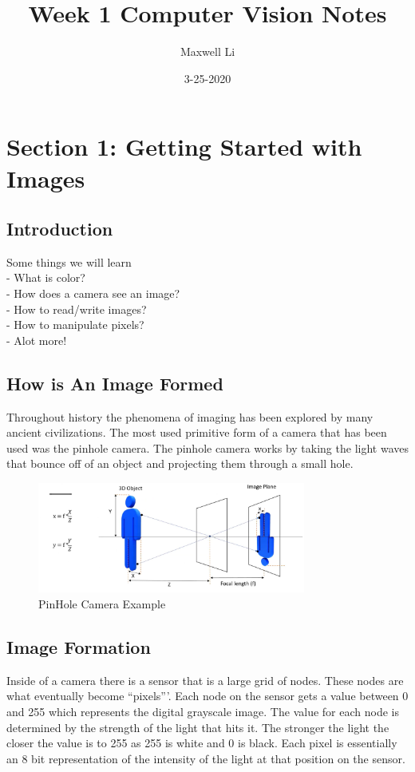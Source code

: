 \documentclass[fleqn]{article}
\title{Week 1 Computer Vision Notes}
\date{3-25-2020}
\author{Maxwell Li}
\begin{document}
  \color{black!20!white}
  \pagecolor{black!80!white}
  \maketitle
  \tableofcontents
  \setcounter{secnumdepth}{0}
  \newpage

  \section{\textbf{Section 1: Getting Started with Images}}
    \subsection{Introduction}
    Some things we will learn\\
    \quad - What is color?\\
    \quad - How does a camera see an image?\\
    \quad - How to read/write images?\\
    \quad - How to manipulate pixels?\\
    \quad - Alot more!

    \subsection{How is An Image Formed}
    Throughout history the phenomena of imaging has been explored by many ancient civilizations. The most used primitive form of a camera that has been used was the pinhole camera. The pinhole camera works by taking the light waves that bounce off of an object and projecting them through a small hole.

    \begin{figure}[h]
      \centering
      \includegraphics[width = 250pt]{pinholecamera.png}
      \caption{PinHole Camera Example}
      \label{fig: Pinhole Camera}
    \end{figure}


    \subsection{Image Formation}
    Inside of a camera there is a sensor that is a large grid of nodes. These nodes are what eventually become ``pixels'''. Each node on the sensor gets a value between 0 and 255 which represents the digital grayscale image. The value for each node is determined by the strength of the light that hits it. The stronger the light the closer the value is to 255 as 255 is white and 0 is black. Each pixel is essentially an 8 bit representation of the intensity of the light at that position on the sensor.
\end{document}
